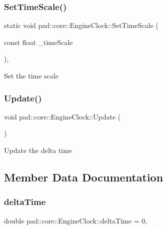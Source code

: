 \subsubsection{\texorpdfstring{Set\+Time\+Scale()}{SetTimeScale()}}
{\footnotesize\ttfamily static void pad\+::core\+::\+Engine\+Clock\+::\+Set\+Time\+Scale (\begin{DoxyParamCaption}\item[{const float}]{\+\_\+time\+Scale }\end{DoxyParamCaption})\hspace{0.3cm}{\ttfamily [inline]}, {\ttfamily [static]}}

Set the time scale \mbox{\label{classpad_1_1core_1_1_engine_clock_a790635e126f52744162f047aafdb7bcf}} 
\subsubsection{\texorpdfstring{Update()}{Update()}}
{\footnotesize\ttfamily void pad\+::core\+::\+Engine\+Clock\+::\+Update (\begin{DoxyParamCaption}{ }\end{DoxyParamCaption})\hspace{0.3cm}{\ttfamily [static]}}

Update the delta time 

\subsection{Member Data Documentation}
\mbox{\label{classpad_1_1core_1_1_engine_clock_aa72d74511b2e44787d4d45a8fcbb0dd7}} 
\subsubsection{\texorpdfstring{delta\+Time}{deltaTime}}
{\footnotesize\ttfamily double pad\+::core\+::\+Engine\+Clock\+::delta\+Time = 0\hspace{0.3cm}{\ttfamily [static]}, {\ttfamily [private]}}

